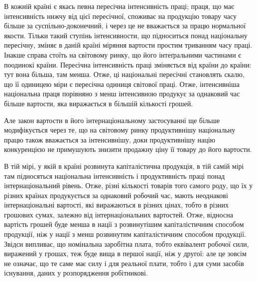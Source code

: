 В кожній країні є якась певна пересічна інтенсивність праці;
праця, що має інтенсивність нижчу від цієї пересічної, споживає
на продукцію товару часу більше за суспільно-доконечний,
і через це не вважається за працю нормальної якости. Тільки
такий ступінь інтенсивности, що підноситься понад національну
пересічну, зміняє в даній країні міряння вартости простим триванням
часу праці. Інакше справа стоїть на світовому ринку,
що його інтеґральними частинами є поодинокі країни. Пересічна
інтенсивність праці зміняється від країни до країни: тут вона
більша, там менша. Отже, ці національні пересічні становлять
скалю, що її одиницею міри є пересічна одиниця світової праці.
Отже, інтенсивніша національна праця порівняно з менш інтенсивною
продукує за однаковий час більше вартости, яка виражається
в більшій кількості грошей.

Але закон вартости в його інтернаціональному застосуванні
ще більше модифікується через те, що на світовому ринку продуктивнішу
національну працю також вважається за інтенсивнішу,
доки продуктивнішу націю конкуренцією не примушують
знизити продажну ціну її товару до його вартости.

В тій мірі, у якій в країні розвинута капіталістична продукція,
в тій самій мірі там підносяться національна інтенсивність і
продуктивність праці понад інтернаціональний рівень. Отже,
різні кількості товарів того самого роду, що їх у різних країнах
продукується за однаковий робочий час, мають неоднакові інтернаціональні
вартості, які виражаються в різних цінах, тобто
в різних грошових сумах, залежно від інтернаціональних вартостей.
Отже, відносна вартість грошей буде менша в нації з
розвинутішим капіталістичним способом продукції, ніж у нації
з менш розвинутим капіталістичним способом продукції. Звідси
випливає, що номінальна заробітна плата, тобто еквівалент робочої
сили, виражений у грошах, теж буде вища в першої нації,
ніж у другої: але це зовсім не означає, що те саме має силу і
для реальної плати, тобто і для суми засобів існування, даних
у розпорядження робітникові.

